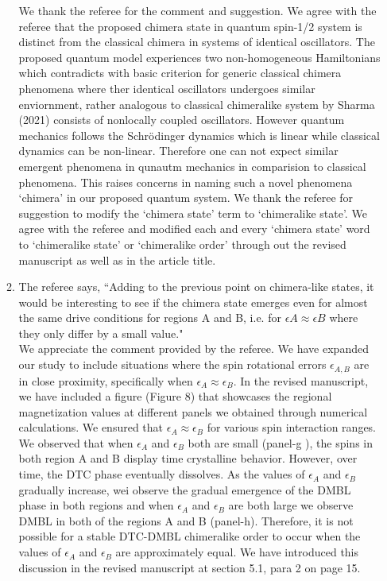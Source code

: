 \documentclass[aps,prb,reprint,showpacs,floatfix,superscriptaddress, onecolumn, nofootinbib, 10pt]{revtex4-2}
\newcommand{\response}[1]{{\color{black}#1}} %
\newcommand{\comment}[1]{{\color{blue}#1}} %
\begin{document}
\begin{enumerate}
\begin{enumerate}
			\response{We thank the referee for the comment and suggestion. We agree with the referee that the proposed chimera state in quantum spin-1/2 system is distinct from the classical chimera in systems of identical oscillators. The proposed quantum model experiences two non-homogeneous Hamiltonians which contradicts with basic criterion for generic classical chimera phenomena where ther identical oscillators undergoes similar enviornment, rather analogous to classical chimeralike system by Sharma (2021) consists of nonlocally coupled oscillators. However quantum mechanics follows the Schr\"{o}dinger dynamics which is linear while classical dynamics can be non-linear. Therefore one can not expect similar emergent phenomena in qunautm mechanics in comparision to classical phenomena. This raises concerns in naming such a novel phenomena `chimera' in our proposed quantum system. We thank the referee for suggestion to modify the `chimera state' term to `chimeralike state'. We agree with the referee and modified each and every `chimera state' word to `chimeralike state' or `chimeralike order' through out the revised manuscript as well as in the article title.}\\
		
		\item The referee says, \comment{``Adding to the previous point on chimera-like states, it would be interesting to see if the chimera state emerges even for almost the same drive conditions for regions A and B, i.e. for $\epsilon A \approx \epsilon B$ where they only differ by a small value."}\\	
			
		\response{	
		We appreciate the comment provided by the referee. We have expanded our study to include situations where the spin rotational errors $\epsilon_{A,B}$ are in close proximity, specifically when $\epsilon_A \approx \epsilon_B$. In the revised manuscript, we have included a figure (Figure 8) that showcases the regional magnetization values at different panels we obtained through numerical calculations. We ensured that $\epsilon_A \approx \epsilon_B$ for various spin interaction ranges. We observed that when $\epsilon_A$ and $\epsilon_B$ both are small (panel-g ), the spins in both region A and B display time crystalline behavior. However, over time, the DTC phase eventually dissolves. As the values of $\epsilon_A$ and $\epsilon_B$ gradually increase, wei observe the gradual emergence of the DMBL phase in both regions and when $\epsilon_A$ and $\epsilon_B$ are both large we observe DMBL in both of the regions A and B (panel-h). Therefore, it is not possible for a stable DTC-DMBL chimeralike order to occur when the values of $\epsilon_A$ and $\epsilon_B$ are approximately equal. We have introduced this discussion in the revised manuscript at section 5.1, para 2 on page 15.
		}\\
	

\end{enumerate}
\end{enumerate}
\end{document}
